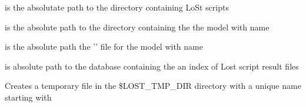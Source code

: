 \begin{description}
 is the absolutate path to the directory containing LoSt scripts


 is the absolute path to the directory containing the the model with name 

 is the absolute path the '' file for the model with name 

 is absolute path to the database containing the an index of Lost script result files

Creates a temporary file in the \$LOST_TMP_DIR directory with a unique name starting with 
\end{description}

